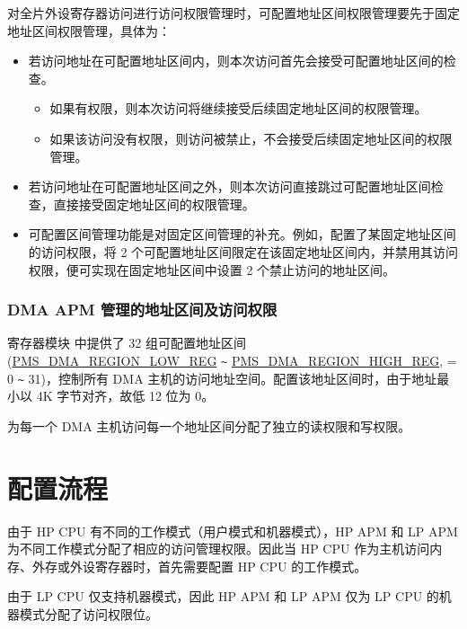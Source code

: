\documentclass[main\_\_CN.tex]{subfiles}
\begin{document}
对全片外设寄存器访问进行访问权限管理时，可配置地址区间权限管理要先于固定地址区间权限管理，具体为：

\begin{itemize}
    \item 若访问地址在可配置地址区间内，则本次访问首先会接受可配置地址区间的检查。
    \begin{itemize}
        \item 如果有权限，则本次访问将继续接受后续固定地址区间的权限管理。
        \item 如果该访问没有权限，则访问被禁止，不会接受后续固定地址区间的权限管理。
    \end{itemize}
    \item 若访问地址在可配置地址区间之外，则本次访问直接跳过可配置地址区间检查，直接接受固定地址区间的权限管理。

    \item 可配置区间管理功能是对固定区间管理的补充。例如，配置了某固定地址区间的访问权限，将 2 个可配置地址区间限定在该固定地址区间内，并禁用其访问权限，便可实现在固定地址区间中设置 2 个禁止访问的地址区间。
\end{itemize}

\subsubsection{DMA APM 管理的地址区间及访问权限}

寄存器模块  中提供了 32 组可配置地址区间 (\hyperref[fielddesc:PMSDMAREGIONNLOW]{PMS\_DMA\_REGION\_LOW\_REG} \verb+~+ \hyperref[fielddesc:PMSDMAREGIONNHIGH]{PMS\_DMA\_REGION\_HIGH\_REG},  = 0 \verb+~+ 31)，控制所有 DMA 主机的访问地址空间。配置该地址区间时，由于地址最小以 4K 字节对齐，故低 12 位为 0。

 为每一个 DMA 主机访问每一个地址区间分配了独立的读权限和写权限。

\section{配置流程}

由于 HP CPU 有不同的工作模式（用户模式和机器模式），HP APM 和 LP APM 为不同工作模式分配了相应的访问管理权限。因此当 HP CPU 作为主机访问内存、外存或外设寄存器时，首先需要配置 HP CPU 的工作模式。

由于 LP CPU 仅支持机器模式，因此 HP APM 和 LP APM 仅为 LP CPU 的机器模式分配了访问权限位。
\end{document}
